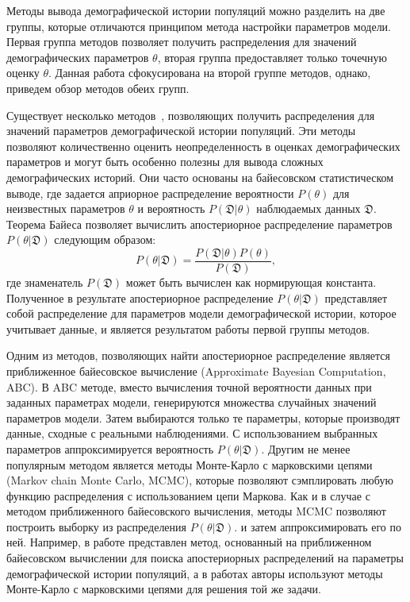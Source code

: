 Методы вывода демографической истории популяций можно разделить на две группы, которые отличаются принципом метода настройки параметров модели.
Первая группа методов позволяет получить распределения для значений демографических параметров $\theta$, вторая группа предоставляет только точечную оценку $\theta$.
Данная работа сфокусирована на второй группе методов, однако, приведем обзор методов обеих групп.

Существует несколько методов~\cite{cornuet2014diyabc,gronau2011bayesian, hey2018phylogeny}, позволяющих получить распределения для значений параметров демографической истории популяций. 
Эти методы позволяют количественно оценить неопределенность в оценках демографических параметров и могут быть особенно полезны для вывода сложных демографических историй.
Они часто основаны на байесовском статистическом выводе, где задается априорное распределение вероятности $P(\theta)$ для неизвестных параметров $\theta$ и вероятность $P(\mathfrak{D} | \theta)$ наблюдаемых данных $\mathfrak{D}$.
Теорема Байеса позволяет вычислить апостериорное распределение параметров $P(\theta | \mathfrak{D})$ следующим образом:
$$P(\theta | \mathfrak{D}) = \frac{P(\mathfrak{D} | \theta) P(\theta)}{P(\mathfrak{D})},$$
где знаменатель $P(\mathfrak{D})$ может быть вычислен как нормирующая константа.
Полученное в результате апостериорное распределение $P(\theta | \mathfrak{D})$ представляет собой распределение для параметров модели демографической истории, которое учитывает данные, и является результатом работы первой группы методов.

Одним из методов, позволяющих найти апостериорное распределение является приближенное байесовское вычисление (Approximate Bayesian Computation, ABC).
В ABC методе, вместо вычисления точной вероятности данных при заданных параметрах модели, генерируются множества случайных значений параметров модели.
Затем выбираются только те параметры, которые производят данные, сходные с реальными наблюдениями.
С использованием выбранных параметров аппроксимируется вероятность $P(\theta | \mathfrak{D})$.
Другим не менее популярным методом является методы Монте-Карло с марковскими цепями (Markov chain Monte Carlo, MCMC), которые позволяют сэмплировать любую функцию распределения с использованием цепи Маркова.
Как и в случае с методом приближенного байесовского вычисления, методы MCMC позволяют построить выборку из распределения $P(\theta | \mathfrak{D})$. и затем аппроксимировать его по ней.
Например, в работе \cite{cornuet2014diyabc} представлен метод, основанный на приближенном байесовском вычислении для поиска апостериорных распределений на параметры демографической истории популяций, а в работах \cite{gronau2011bayesian, hey2018phylogeny} авторы используют методы Монте-Карло с марковскими цепями для решения той же задачи.






